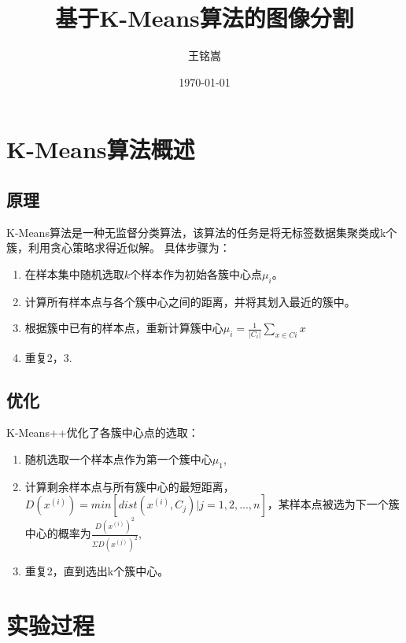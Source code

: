 \documentclass{article}
\title{基于K-Means算法的图像分割}
\author{王铭嵩}
\date{\today}
\begin{document}
\maketitle
\section{K-Means算法概述}
\subsection{原理}
K-Means算法是一种无监督分类算法，该算法的任务是将无标签数据集聚类成k个簇，利用贪心策略求得近似解。
具体步骤为：
\begin{enumerate}
    \item 在样本集中随机选取$k$个样本作为初始各簇中心点$\mu_{i}$。
    \item 计算所有样本点与各个簇中心之间的距离，并将其划入最近的簇中。
    \item 根据簇中已有的样本点，重新计算簇中心$\mu_{i}=\frac{1}{|C_{i}|}\sum_{x\in{C{i}}}x$
    \item 重复2，3.
\end{enumerate}
\subsection{优化}
K-Means++优化了各簇中心点的选取：
\begin{enumerate}
    \item 随机选取一个样本点作为第一个簇中心$\mu_1$,
    \item 计算剩余样本点与所有簇中心的最短距离，$D(x^{(i)})=min[dist(x^{(i)},C_j)|j=1,2,...,n]$，某样本点被选为下一个簇中心的概率为$\frac{D(x^{(i)})^2}{\Sigma D(x^{(j)})^2}$,
    \item 重复2，直到选出k个簇中心。
\end{enumerate}
\section{实验过程}
\end{document}

